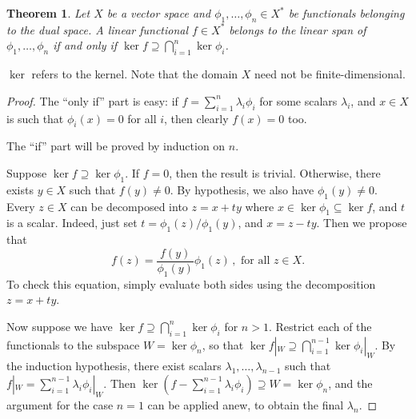 \documentclass[12pt]{article}
\newtheorem*{thm*}{Theorem}
\begin{document}

\begin{thm*}
Let $X$ be a vector space and $\phi_1, \dotsc, \phi_n \in X^*$ be 
functionals belonging to the dual space.
A linear functional $f \in X^*$ belongs to the linear span of 
$\phi_1, \dotsc, \phi_n$ if and only if 
$\ker f \supseteq \bigcap_{i=1}^n \ker \phi_i$.
\end{thm*}

$\ker$ refers to the kernel.
Note that the domain $X$ need not be finite-dimensional.

\begin{proof}
The ``only if'' part is easy: if $f = \sum_{i=1}^n \lambda_i \phi_i$
for some scalars $\lambda_i$, and $x \in X$ 
is such that $\phi_i(x) = 0$ for all $i$, then clearly $f(x) = 0$ too.

The ``if'' part will be proved by induction on $n$.

Suppose $\ker f \supseteq \ker \phi_1$.
If $f = 0$, then the result is trivial.
Otherwise, there exists $y \in X$ such that $f(y) \neq 0$.
By hypothesis, we also have $\phi_1(y) \neq 0$.
Every $z \in X$ can be decomposed into $z = x+ ty$
where $x \in \ker \phi_1 \subseteq \ker f$, and $t$ is a scalar.
Indeed, just set $t = \phi_1(z)/\phi_1(y)$, and $x = z-ty$.
Then we propose that 
\[
f(z) = \frac{f(y)}{\phi_1(y)} \phi_1(z)\,, \text{ for all $z \in X$.}
\]
To check this equation, simply evaluate both sides using the decomposition
$z = x+ty$.

Now suppose we have $\ker f \supseteq \bigcap_{i=1}^n \ker \phi_i$
for $n > 1$.
Restrict each of the functionals
to the subspace $W = \ker \phi_n$, so that 
$\ker f|_W \supseteq \bigcap_{i=1}^{n-1} \ker \phi_i|_W$.
By the induction hypothesis, there exist scalars $\lambda_1, \dotsc, \lambda_{n-1}$
such that $f|_W = \sum_{i=1}^{n-1} \lambda_i \phi_i|_W$.
Then $\ker ( f - \sum_{i=1}^{n-1} \lambda_i \phi_i ) \supseteq 
W = \ker \phi_n$, and the argument for the case $n=1$ 
can be applied anew, to obtain the final $\lambda_n$.
\end{proof}

\end{document}
